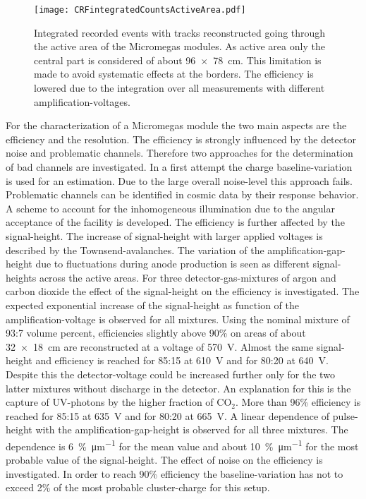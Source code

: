 \documentclass[
twoside,            %
BCOR1.4cm,          %
10pt,               %
headings=normal,    %
headsepline,        %
clearplainpage,		%
final,              %
div=14,
open=right,
bibliography=toc
]{scrreprt}
\begin{document}
\begin{figure}[!h]
	\centering
	\texttt{[image: CRFintegratedCountsActiveArea.pdf]}
	\vspace{-2mm}
	\caption{
		Integrated recorded events with tracks reconstructed going through the active area of the Micromegas modules.
		As active area only the central part is considered of about \SI[product-units = repeat]{96 x 78}{cm}.
		This limitation is made to avoid systematic effects at the borders.
		The efficiency is lowered due to the integration over all measurements with different amplification-voltages.
	}
	\label{CRFluminosity} 
\end{figure}

For the characterization of a Micromegas module the two main aspects are the efficiency and the resolution.
The efficiency is strongly influenced by the detector noise and problematic channels.
Therefore two approaches for the determination of bad channels are investigated.
In a first attempt the charge baseline-variation is used for an estimation.
Due to the large overall noise-level this approach fails.
Problematic channels can be identified in cosmic data by their response behavior.
A scheme to account for the inhomogeneous illumination due to the angular acceptance of the facility is developed.
The efficiency is further affected by the signal-height.
The increase of signal-height with larger applied voltages is described by the Townsend-avalanches.
The variation of the amplification-gap-height due to fluctuations during anode production is seen as different signal-heights across the active areas.
For three detector-gas-mixtures of argon and carbon dioxide the effect of the signal-height on the efficiency is investigated.
The expected exponential increase of the signal-height as function of the amplification-voltage is observed for all mixtures.
Using the nominal mixture of 93:7 volume percent, efficiencies slightly above 90\% on areas of about \SI[product-units = repeat]{32 x 18}{\cm} are reconstructed at a voltage of \SI{570}{V}.
Almost the same signal-height and efficiency is reached for 85:15 at \SI{610}{V} and for 80:20 at \SI{640}{V}.
Despite this the detector-voltage could be increased further only for the two latter mixtures without discharge in the detector.
An explanation for this is the capture of UV-photons by the higher fraction of CO$_2$.
More than 96\% efficiency is reached for 85:15 at \SI{635}{V} and for 80:20 at \SI{665}{V}.
A linear dependence of pulse-height with the amplification-gap-height is observed for all three mixtures.
The dependence is \SI{6}{\%\per\micro\m} for the mean value and about \SI{10}{\%\per\micro\m} for the most probable value of the signal-height.
The effect of noise on the efficiency is investigated.
In order to reach 90\% efficiency the baseline-variation has not to exceed 2\% of the most probable cluster-charge for this setup.
\end{document}
